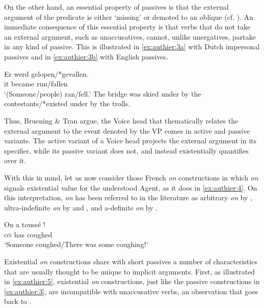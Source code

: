 \documentclass[output=paper,colorlinks,citecolor=brown]{langscibook}
\begin{document}
On the other hand, an essential property of passives is that the external argument of the predicate is either ‘missing’ or demoted to an oblique (cf. \citealt{perlmutter1983a}). An immediate consequence of this essential property is that verbs that do not take an external argument, such as unaccusatives, cannot, unlike unergatives, partake in any kind of passive. This is illustrated in \ref{ex:authier:3a} with Dutch impersonal passives and in \ref{ex:authier:3b} with English passives. 


\begin{exe}
\ex\label{ex:authier:3}
\begin{xlist}
\ex\label{ex:authier:3a}
\gll Er werd gelopen/*gevallen.\\
it became run/fallen\\ 
\glt `(Someone/people) ran/fell.'
\ex \label{ex:authier:3b} The bridge was skied under by the contestants/*existed under by the trolls.
\end{xlist}
\citep[101]{perlmutter1984a}
\end{exe}

Thus, Bruening \& Tran argue, the Voice head that thematically relates the external argument to the event denoted by the VP comes in active and passive variants. The active variant of a Voice head projects the external argument in its specifier, while its passive variant does not, and instead existentially quantifies over it.

With this in mind, let us now consider those French \textit{on} constructions in which \textit{on} signals existential value for the understood Agent, as it does in \ref{ex:authier:4}. On this interpretation, \textit{on} has been referred to in the literature as arbitrary \textit{on} by \citet{egerland2003a}, ultra-indefinite \textit{on} by \citet{koenig1999a} and \citet{collins2017a}, and a-definite \textit{on} by \citet{koenig2000a}.


\begin{exe}
\ex\label{ex:authier:4}
\gll On a toussé ! \\
\textsc{on} has  coughed \\
\glt `Someone coughed/There was some coughing!'
\end{exe}

Existential \textit{on} constructions share with short passives a number of characteristics that are usually thought to be unique to implicit arguments. First, as illustrated in \ref{ex:authier:5}, existential \textit{on} constructions, just like the passive constructions in \ref{ex:authier:3}, are incompatible with unaccusative verbs, an observation that goes back to \citet{cinque1988a}.
\end{document}
